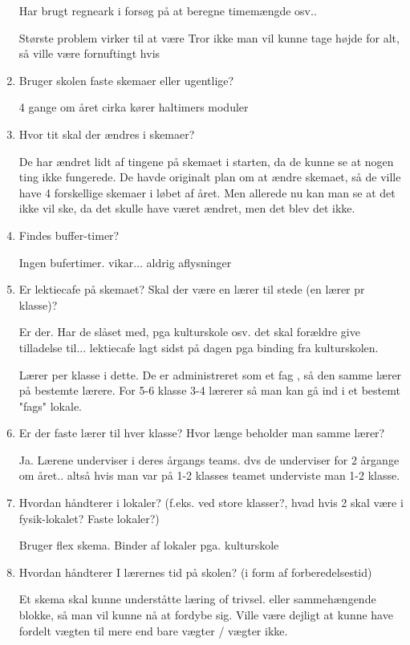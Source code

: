 \begin{enumerate}
Har brugt regneark i forsøg på at beregne timemængde osv..

Største problem virker til at være 
Tror ikke man vil kunne tage højde for alt, så ville være fornuftingt hvis 
	
	\item Bruger skolen faste skemaer eller ugentlige?
	
	4 gange om året cirka
	kører haltimers moduler 

	\item Hvor tit skal der ændres i skemaer?

	De har ændret lidt af tingene på skemaet i starten, da de kunne se at nogen ting ikke fungerede. De havde originalt plan om at ændre skemaet, så de ville have 4 forskellige skemaer i løbet af året. Men allerede nu kan man se at det ikke vil ske, da det skulle have været ændret, men det blev det ikke. 

	\item Findes buffer-timer? 
	
	Ingen bufertimer. vikar... aldrig aflysninger
	

	\item Er lektiecafe på skemaet? Skal der være en lærer til stede (en lærer pr klasse)?

	Er der. Har de slåset med, pga kulturskole osv. det skal forældre give tilladelse til... lektiecafe lagt sidst på dagen pga binding fra kulturskolen.  

Lærer per klasse i dette. De er administreret som et fag , så den samme lærer på bestemte lærere. For 5-6 klasse 3-4 lærerer så man kan gå ind i et bestemt "fags" lokale. 
	
	\item Er der faste lærer til hver klasse? Hvor længe beholder man samme lærer?

	Ja. Lærene underviser i deres årgangs teams. dvs de underviser for 2 årgange om året.. altså hvis man var på 1-2 klasses teamet underviste man 1-2 klasse.
	
	\item Hvordan håndterer i lokaler? (f.eks. ved store klasser?, hvad hvis 2 skal være i fysik-lokalet? Faste lokaler?)
	
	Bruger flex skema. Binder af lokaler pga. kulturskole
	
	\item Hvordan håndterer I lærernes tid på skolen? (i form af forberedelsestid)
	
	Et skema skal kunne underståtte læring of trivsel. eller sammehængende blokke, så man vil kunne nå at fordybe sig. Ville være dejligt at kunne have fordelt vægten til mere end bare vægter / vægter ikke. 
	

\end{enumerate}
